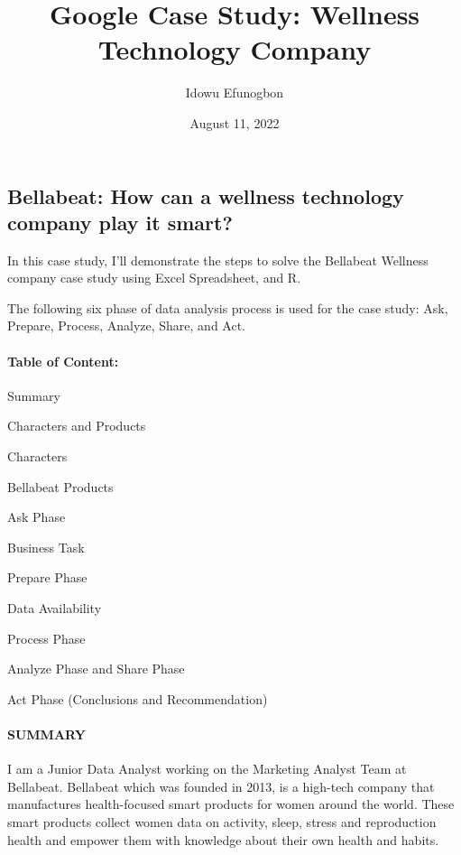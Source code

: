 \documentclass[
]{article}
\title{Google Case Study: Wellness Technology Company}
\author{Idowu Efunogbon}
\date{August 11, 2022}
\begin{document}
\maketitle

\hypertarget{bellabeat-how-can-a-wellness-technology-company-play-it-smart}{%
\subsection{Bellabeat: How can a wellness technology company play it
smart?}\label{bellabeat-how-can-a-wellness-technology-company-play-it-smart}}

In this case study, I'll demonstrate the steps to solve the Bellabeat
Wellness company case study using Excel Spreadsheet, and R.

The following six phase of data analysis process is used for the case
study: Ask, Prepare, Process, Analyze, Share, and Act.

\hypertarget{table-of-content}{%
\paragraph{\texorpdfstring{\textbf{Table of
Content:}}{Table of Content:}}\label{table-of-content}}

Summary

Characters and Products

Characters

Bellabeat Products

Ask Phase

Business Task

Prepare Phase

Data Availability

Process Phase

Analyze Phase and Share Phase

Act Phase (Conclusions and Recommendation)

\hypertarget{summary}{%
\paragraph{\texorpdfstring{\textbf{SUMMARY}}{SUMMARY}}\label{summary}}

I am a Junior Data Analyst working on the Marketing Analyst Team at
Bellabeat. Bellabeat which was founded in 2013, is a high-tech company
that manufactures health-focused smart products for women around the
world. These smart products collect women data on activity, sleep,
stress and reproduction health and empower them with knowledge about
their own health and habits.
\end{document}
